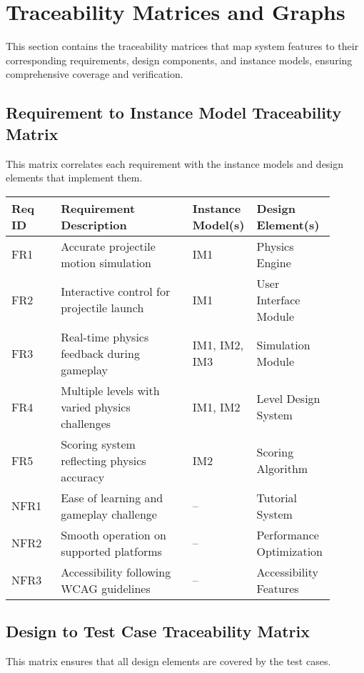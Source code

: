 \documentclass[12pt]{article}
\begin{document}
\section{Traceability Matrices and Graphs}

This section contains the traceability matrices that map system features to their corresponding requirements, design components, and instance models, ensuring comprehensive coverage and verification.

\subsection{Requirement to Instance Model Traceability Matrix}
This matrix correlates each requirement with the instance models and design elements that implement them.

\begin{longtable}{|p{0.15\linewidth}|p{0.4\linewidth}|p{0.15\linewidth}|p{0.2\linewidth}|}
\hline
\textbf{Req ID} & \textbf{Requirement Description} & \textbf{Instance Model(s)} & \textbf{Design Element(s)} \\
\hline
FR1 & Accurate projectile motion simulation & IM1 & Physics Engine \\
FR2 & Interactive control for projectile launch & IM1 & User Interface Module \\
FR3 & Real-time physics feedback during gameplay & IM1, IM2, IM3 & Simulation Module \\
FR4 & Multiple levels with varied physics challenges & IM1, IM2 & Level Design System \\
FR5 & Scoring system reflecting physics accuracy & IM2 & Scoring Algorithm \\
NFR1 & Ease of learning and gameplay challenge & -- & Tutorial System \\
NFR2 & Smooth operation on supported platforms & -- & Performance Optimization \\
NFR3 & Accessibility following WCAG guidelines & -- & Accessibility Features \\
\hline
\end{longtable}

\subsection{Design to Test Case Traceability Matrix}
This matrix ensures that all design elements are covered by the test cases.
\end{document}

